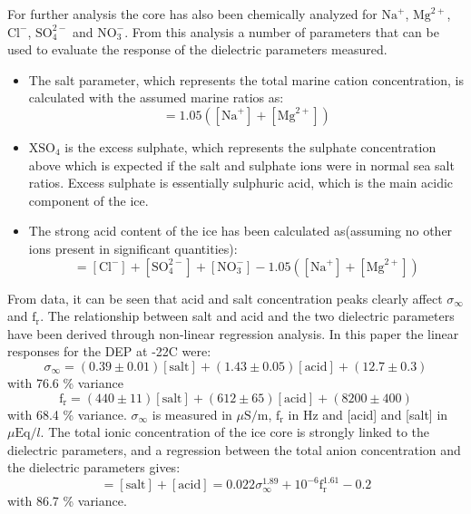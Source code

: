 \documentclass[11pt]{article}
\begin{document}
For further analysis the core has also been chemically analyzed for $\text{Na}^+$, $\text{Mg}^{2+}$, $\text{Cl}^-$, $\text{SO}_4^{2-}$ and $\text{NO}_3^-$. From this analysis a number of parameters that can be used to evaluate the response of the dielectric parameters measured.
\begin{itemize}
	\item The salt parameter, which represents the total marine cation concentration, is calculated with the assumed marine ratios as:
	\begin{equation}
		[\text{salt}] = 1.05 ([\text{Na}^+] + [\text{Mg}^{2+}])
	\end{equation}
	\item $\text{XSO}_4$ is the excess sulphate, which represents the sulphate concentration above which is expected if the salt and sulphate ions were in normal sea salt ratios. Excess sulphate is essentially sulphuric acid, which is the main acidic component of the ice.
	\item The strong acid content of the ice has been calculated as(assuming no other ions present in significant quantities):
	\begin{equation}
		[\text{acid}] = [\text{Cl}^-] + [\text{SO}_4^{2-}] + [\text{NO}_3^-] - 1.05 ([\text{Na}^+] + [\text{Mg}^{2+}])
	\end{equation}
\end{itemize}
From data, it can be seen that acid and salt concentration peaks clearly affect $\sigma_{\infty}$ and $\text{f}_{\text{r}}$. The relationship between salt and acid and the two dielectric parameters have been derived through non-linear regression analysis. In this paper the linear responses for the DEP at -22\degree C were:
\begin{equation}
	\sigma_{\infty} = (0.39\pm 0.01)[\text{salt}] + (1.43\pm 0.05)[\text{acid}] + (12.7\pm 0.3)
\end{equation}
with 76.6 \% variance
\begin{equation}
	\text{f}_{\text{r}} = (440\pm 11)[\text{salt}] + (612\pm 65)[\text{acid}] + (8200\pm 400)
\end{equation}
with 68.4 \% variance. $\sigma_{\infty}$ is measured in $\mu\text{S}/\text{m}$, $\text{f}_{\text{r}}$ in Hz and [acid] and [salt] in $\mu\text{Eq}/l$.
The total ionic concentration of the ice core is strongly linked to the dielectric parameters, and a regression between the total anion concentration and the dielectric parameters gives:
\begin{equation}
	[\text{anions}] = [\text{salt}] + [\text{acid}] = 0.022\sigma_{\infty}^{1.89} + 10^{-6}\text{f}_{\text{r}}^{1.61} - 0.2
\end{equation}
with 86.7 \% variance.
\end{document}
